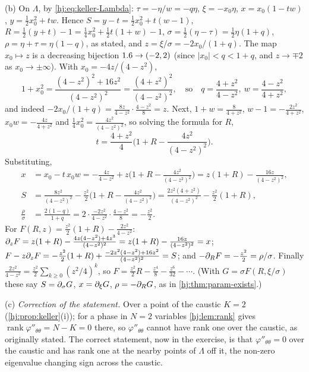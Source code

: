 (b) On $\Lambda$, by \eqref{hj:eq:keller-Lambda}: $\tau=-\eta/w=-q\eta$, $\xi=-x_0\eta$,
$x=x_0(1-tw)$, $y=\frac12x_0^2+tw$. Hence $S=y-t=\frac12x_0^2+t(w-1)$, $R=\frac12(y+t)-1=
\frac14x_0^2+\frac12t(1+w)-1$, $\sigma=\frac12(\eta-\tau)=\frac12\eta(1+q)$, $\rho=\eta+\tau=
\eta(1-q)$, as stated, and $z=\xi/\sigma=-2x_0/(1+q)$. The map $x_0\mapsto z$ is a decreasing
bijection $1.6\to(-2,2)$ (since $|x_0|<q<1+q$, and $z\to\mp2$ as $x_0\to\pm\infty$). With
$x_0=-4z/(4-z^2)$,
\begin{equation*}
1+x_0^2=\frac{(4-z^2)^2+16z^2}{(4-z^2)^2}=\frac{(4+z^2)^2}{(4-z^2)^2},\quad\text{so}\quad
q=\frac{4+z^2}{4-z^2},\ w=\frac{4-z^2}{4+z^2},
\end{equation*}
and indeed $-2x_0/(1+q)=\frac{8z}{4-z^2}\cdot\frac{4-z^2}8=z$. Next, $1+w=\frac8{4+z^2}$,
$w-1=-\frac{2z^2}{4+z^2}$, $x_0w=-\frac{4z}{4+z^2}$ and $\frac14x_0^2=\frac{4z^2}{(4-z^2)^2}$, so
solving the formula for $R$,
\begin{equation*}
t=\frac{4+z^2}4\Big(1+R-\frac{4z^2}{(4-z^2)^2}\Big).
\end{equation*}
Substituting,
\begin{align*}
x&=x_0-t\,x_0w=-\frac{4z}{4-z^2}+z\Big(1+R-\frac{4z^2}{(4-z^2)^2}\Big)=z(1+R)-\frac{16z}
{(4-z^2)^2},\\
S&=\frac{8z^2}{(4-z^2)^2}-\frac{z^2}2\Big(1+R-\frac{4z^2}{(4-z^2)^2}\Big)=\frac{2z^2(4+z^2)}
{(4-z^2)^2}-\frac{z^2}2(1+R),\\
\frac\rho\sigma&=\frac{2(1-q)}{1+q}=2\cdot\frac{-2z^2}{4-z^2}\cdot\frac{4-z^2}8=-\frac{z^2}2 .
\end{align*}
For $F(R,z)=\frac{z^2}2(1+R)-\frac{2z^2}{4-z^2}$: $\partial_zF=z(1+R)-\frac{4z(4-z^2)+4z^3}{(4-z^2)^2}=
z(1+R)-\frac{16z}{(4-z^2)^2}=x$; $F-z\partial_zF=-\frac{z^2}2(1+R)+\frac{-2z^2(4-z^2)+16z^2}{(4-z^2)^2}
=S$; and $-\partial_RF=-\frac{z^2}2=\rho/\sigma$. Finally $\frac{2z^2}{4-z^2}=\frac{z^2}2\sum_{k\ge0}
(z^2/4)^k$, so $F=\frac{z^2}2R-\frac{z^4}8-\frac{z^6}{32}-\cdots$. (With $G=\sigma F(R,\xi/
\sigma)$ these say $S=\partial_\sigma G$, $x=\partial_\xi G$, $\rho=-\partial_RG$, as in
\cref{hj:thm:param-exists}.)

(c) \emph{Correction of the statement.} Over a point of the caustic $K=2$
(\cref{hj:prop:keller}(i)); for a phase in $N=2$ variables \cref{hj:lem:rank} gives
$\operatorname{rank}\varphi''_{\theta\theta}=N-K=0$ there, so $\varphi''_{\theta\theta}$ cannot
have rank one over the caustic, as originally stated. The correct statement, now in the
exercise, is that $\varphi''_{\theta\theta}=0$ over the caustic and has rank one at the
nearby points of $\Lambda$ off it, the non-zero eigenvalue changing sign across the caustic.


